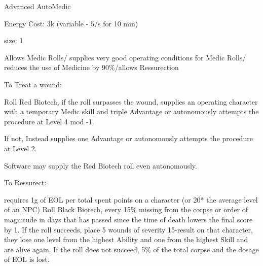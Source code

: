 Advanced AutoMedic\par
Energy Cost: 3k (variable - 5/s for 10 min)\par
size: 1

Allows Medic Rolls/ supplies very good operating conditions for Medic Rolls/ reduces the use of Medicine by 90\%/allows Ressurection\par
To Treat a wound:\par
Roll Red Biotech, if the roll surpasses the wound, supplies an operating character with a temporary Medic skill and
triple Advantage or autonomously attempts the procedure at Level 4 mod -1.\par
If not, Instead supplies one Advantage or autonomously attempts the procedure at Level 2.\par
Software may supply the Red Biotech roll even autonomously.\par
To Ressurect:\par
requires 1g of EOL per total spent points on a character (or 20* the average level of an NPC)
Roll Black Biotech, every 15\% missing from the corpse or order of magnitude in days that has passed since the time of death
lowers the final score by 1.
If the roll succeeds, place 5 wounds of severity 15-result on that character, they lose
one level from the highest Ability and one from the highest Skill and are alive again.
If the roll does not succeed,
5\% of the total corpse and the dosage of EOL is lost.

